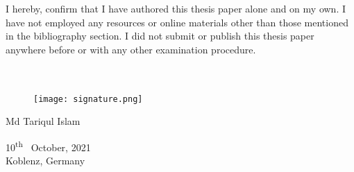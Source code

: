 I hereby, confirm that I have authored this thesis paper alone and on my own. I have not employed any resources or online materials other than those mentioned in the bibliography section. I did not submit or publish this thesis paper anywhere before or with any other examination procedure. \\
\\
\\
\begin{flushright}
{ 
\begin{figure}[H]
\texttt{[image: signature.png]}
\label{fig:signature}
\end{figure}
\noindent Md Tariqul Islam\\}
10\textsuperscript{th} \ October, 2021 \\
Koblenz, Germany 
\end{flushright}
